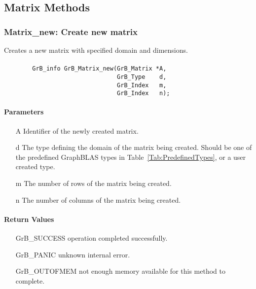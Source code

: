 \subsection{Matrix Methods}

\subsubsection{{\sf Matrix\_new}: Create new matrix}

Creates a new matrix with specified domain and dimensions.

\paragraph{\syntax}

\begin{verbatim}
        GrB_info GrB_Matrix_new(GrB_Matrix *A,
                                GrB_Type    d,
                                GrB_Index   m,
                                GrB_Index   n);
\end{verbatim}

\paragraph{Parameters}

\begin{itemize}[leftmargin=1.1in]
    \item[{\sf A}] Identifier of the newly created matrix.
    \item[{\sf d}] The type defining the domain of the matrix being created. Should be one of the predefined
    GraphBLAS types in Table~\ref{Tab:PredefinedTypes}, or a user created type.
    \item[{\sf m}] The number of rows of the matrix being created.
    \item[{\sf n}] The number of columns of the matrix being created.
\end{itemize}


\paragraph{Return Values}

\begin{itemize}[leftmargin=2.1in]
\item[{\sf GrB\_SUCCESS}]   operation completed successfully.
\item[{\sf GrB\_PANIC}]     unknown internal error.
\item[{\sf GrB\_OUTOFMEM}]  not enough memory available for this method to complete.
\end{itemize}

